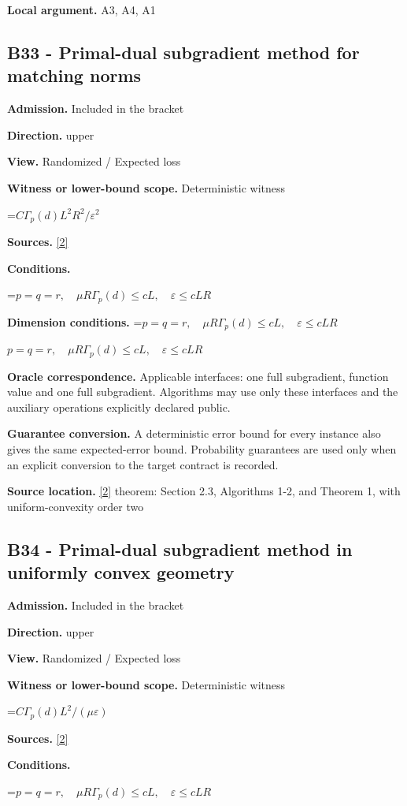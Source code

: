 \documentclass[10pt,a4paper]{article}
\newcommand{\AtlasMath}[1]{\par\begingroup\centering\setbox0=\hbox{$\displaystyle #1$}\ifdim\wd0>1.4\linewidth\typeout{ATLAS WIDE FORMULA: \the\wd0}\fi\ifdim\wd0>\linewidth\resizebox{\linewidth}{!}{\box0}\else\box0\fi\par\endgroup}
\newcommand{\AtlasInlineMath}[1]{\begingroup\setbox0=\hbox{$#1$}\ifdim\wd0>.4\linewidth\endgroup\AtlasMath{#1}\else\endgroup$#1$\fi}
\begin{document}
\textbf{Local argument.} A3, A4, A1

\subsection{B33 - Primal-dual subgradient method for matching norms}
\textbf{Admission.} Included in the bracket

\textbf{Direction.} upper

\textbf{View.} Randomized / Expected loss

\textbf{Witness or lower-bound scope.} Deterministic witness

\AtlasMath{C\Gamma_p(d)L^2R^2/\varepsilon^2}
\textbf{Sources.} \href{https://arxiv.org/pdf/1401.1792}{[2]}

\textbf{Conditions.} 
\AtlasMath{p=q=r,\quad\mu R\Gamma_p(d)\le cL,\quad\varepsilon\le cLR}


\textbf{Dimension conditions.} \AtlasInlineMath{p=q=r,\quad\mu R\Gamma_p(d)\le cL,\quad\varepsilon\le cLR}

\textbf{Oracle correspondence.} Applicable interfaces: one full subgradient, function value and one full subgradient. Algorithms may use only these interfaces and the auxiliary operations explicitly declared public.

\textbf{Guarantee conversion.} A deterministic error bound for every instance also gives the same expected-error bound. Probability guarantees are used only when an explicit conversion to the target contract is recorded.

\textbf{Source location.} \href{https://arxiv.org/pdf/1401.1792}{[2]} theorem: Section 2.3, Algorithms 1-2, and Theorem 1, with uniform-convexity order two

\subsection{B34 - Primal-dual subgradient method in uniformly convex geometry}
\textbf{Admission.} Included in the bracket

\textbf{Direction.} upper

\textbf{View.} Randomized / Expected loss

\textbf{Witness or lower-bound scope.} Deterministic witness

\AtlasMath{C\Gamma_p(d)L^2/(\mu\varepsilon)}
\textbf{Sources.} \href{https://arxiv.org/pdf/1401.1792}{[2]}

\textbf{Conditions.} 
\AtlasMath{p=q=r,\quad\mu R\Gamma_p(d)\le cL,\quad\varepsilon\le cLR}
\end{document}
